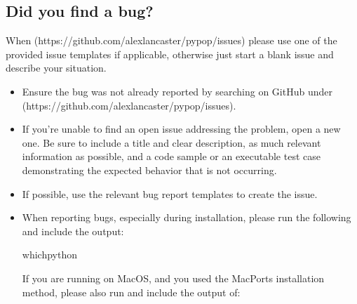 \documentclass[letterpaper,10pt,english,openany,oneside]{sphinxmanual}
\begin{document}
\subsection{Did you find a bug?}
\label{\detokenize{docs/guide-chapter-contributing:did-you-find-a-bug}}\label{\detokenize{docs/guide-chapter-contributing:guide-contributing-bug-report}}
\sphinxAtStartPar
When  (https://github.com/alexlancaster/pypop/issues) please use one of
the provided issue templates if applicable, otherwise just start a
blank issue and describe your situation.
\begin{itemize}
\item {} 
\sphinxAtStartPar
Ensure the bug was not already reported by searching on GitHub under
 (https://github.com/alexlancaster/pypop/issues).

\item {} 
\sphinxAtStartPar
If you’re unable to find an open issue addressing the problem, open
a new one. Be sure to include a title and clear description, as much
relevant information as possible, and a code sample or an executable
test case demonstrating the expected behavior that is not occurring.

\item {} 
\sphinxAtStartPar
If possible, use the relevant bug report templates to create the issue.

\item {} 
\sphinxAtStartPar
When reporting bugs, especially during installation, please run the
following and include the output:

\begin{sphinxVerbatim}[commandchars=\\\{\}]
whichpython
\end{sphinxVerbatim}

\sphinxAtStartPar
If you are running on MacOS, and you used the MacPorts installation
method, please also run and include the output of:

\begin{sphinxVerbatim}[commandchars=\\\{\}]
 
\end{sphinxVerbatim}

\end{itemize}
\end{document}
